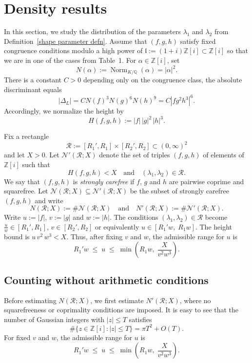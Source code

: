 \documentclass{amsart}
\newcommand{\Q}{\mathbb{Q}}
\newcommand{\op}[1]{\operatorname{#1}}
\newcommand{\Z}{\mathbb{Z}}
\theoremstyle{plain}
\theoremstyle{definition}
\theoremstyle{remark}
\numberwithin{equation}{section}
\begin{document}
\section{Density results}

\par
In this section, we study the distribution of the parameters
$\lambda_1$ and $\lambda_2$ from Definition~\ref{shape parameter defn}.
Assume that $(f,g,h)$ satisfy fixed congruence conditions modulo a high
power of $\mathfrak{l}:=(1+i)\Z[i]\subset \Z[i]$ so that we are in one of the cases from
Table~1.  For $\alpha\in\Z[i]$, set
\[
N(\alpha):=\op{Norm}_{K/\Q}(\alpha)=|\alpha|^2.
\]
\noindent There is a constant $C>0$ depending only on the congruence class,
the absolute discriminant equals
\[
|\Delta_L|=C N(f)^3N(g)^6N(h)^9
=C|fg^2h^3|^6.
\]
Accordingly, we normalize the height by
\[
H(f,g,h):=|f|\,|g|^2\,|h|^3.
\]

\par
Fix a rectangle
\[
\mathcal R:=[R_1',R_1]\times[R_2',R_2]\subset(0,\infty)^2
\]
and let $X>0$.
Let $\mathcal N'(\mathcal R;X)$ denote the set of triples $(f,g,h)$ of elements of $\Z[i]$ such that
\[
H(f,g,h)<X
\quad \text{and}\quad
(\lambda_1,\lambda_2)\in\mathcal R.
\]
We say that $(f,g,h)$ is \emph{strongly carefree} if $f$, $g$ and $h$ are
pairwise coprime and squarefree. Let $\mathcal N(\mathcal R;X)\subseteq \mathcal N'(\mathcal R;X)$ be the subset of strongly carefree $(f,g,h)$ and
write
\[
N(\mathcal R;X):=\#\mathcal N(\mathcal R;X)
\quad\text{and}\quad
N'(\mathcal R;X):=\#\mathcal N'(\mathcal R;X).
\]
\noindent Write $u:=|f|$, $v:=|g|$ and $w:=|h|$. The conditions $(\lambda_1,\lambda_2)\in\mathcal R$ become $\frac{u}{w}\in[R_1',R_1]$, $v\in[R_2',R_2]$ or equivalently $u\in[R_1'w,\;R_1 w]$. The height bound is $u\,v^2\,w^3<X$. Thus, after fixing $v$ and $w$, the admissible range for $u$ is
\begin{equation}\label{eq:u-range}
R_1'w
\;\le\;
u
\;\le\;
\min\!\left(
R_1w,\;
\frac{X}{v^2w^3}
\right).
\end{equation}

\subsection{Counting without arithmetic conditions}

\par
Before estimating $N(\mathcal R;X)$, we first estimate
$N'(\mathcal R;X)$, where no squarefreeness or coprimality conditions
are imposed.
It is easy to see that the number of Gaussian integers with $|z|\le T$
satisfies
\[
\#\{z\in\Z[i]:|z|\le T\}
=
\pi T^2+O(T).
\]
For fixed $v$ and $w$, the admissible range for $u$ is 
\begin{equation}\label{eq:u-range}
R_1'w
\;\le\;
u
\;\le\;
\min\!\left(
R_1 w,\;
\frac{X}{v^2w^3}
\right).
\end{equation}
\end{document}
